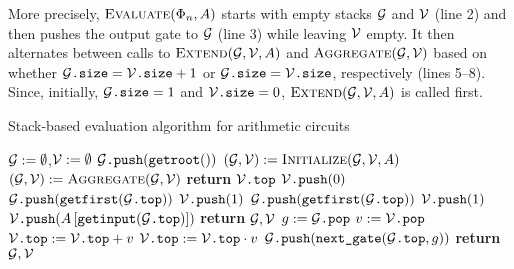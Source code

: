 More precisely, $\textsc{Evaluate}(\Phi_n,A)$ starts with empty stacks $\mathcal{G}$ and $\mathcal{V}$ (line 2) and then pushes the output
gate to $\mathcal{G}$ (line 3) while leaving $\mathcal{V}$ empty. It then alternates between calls to $\textsc{Extend}(\mathcal{G},\mathcal{V},A)$ and $\textsc{Aggregate}(\mathcal{G},\mathcal{V})$ based on whether $\mathcal{G}\texttt{.size} = \mathcal{V}\texttt{.size}+1$ or $\mathcal{G}\texttt{.size} = \mathcal{V}\texttt{.size}$, respectively (lines 5--8). Since, initially, $\mathcal{G}\texttt{.size}=1$ and $\mathcal{V}\texttt{.size}=0$, $\textsc{Extend}(\mathcal{G},\mathcal{V},A)$ is
called first.
 \begin{algorithm}[t]
  \caption{Stack-based evaluation algorithm for arithmetic circuits}
 \label{alg:eval_code}
 \begin{algorithmic}[1]
   \State $\mathcal{G}:=\emptyset$,$\mathcal{V}:=\emptyset$
    \State $\mathcal{G}\texttt{.push}(\texttt{getroot}())$ 
             \State $(\mathcal{G},\mathcal{V}) := \textsc{Initialize}(\mathcal{G},\mathcal{V},A)$
         \Else
             \State $(\mathcal{G},\mathcal{V}):= \textsc{Aggregate}(\mathcal{G},\mathcal{V})$
         \EndIf
     \EndWhile
     \State \textbf{return} $\mathcal{V}\texttt{.top}$
 \EndFunction
     \If{$\isplus{\gettop{\cG}}$} 
         \State $\mathcal{V}\texttt{.push}(0)$
         \State $\mathcal{G}\texttt{.push}(\texttt{getfirst}(\mathcal{G}\texttt{.top}))$ 
     \ElsIf{$\isprod{\gettop{\cG}}$} 
         \State $\mathcal{V}\texttt{.push}(1)$
         \State $\mathcal{G}\texttt{.push}(\texttt{getfirst}(\mathcal{G}\texttt{.top}))$
     \ElsIf{$\isone{\gettop{\cG}}$} 
         \State $\mathcal{V}\texttt{.push}(1)$
     \ElsIf{$\isinput{\gettop{\cG}}$} 
         \State $\mathcal{V}\texttt{.push}(A\left[ \texttt{getinput}(\mathcal{G}\texttt{.top}) \right])$ 
     \EndIf
     \State \textbf{return} $\mathcal{G}, \mathcal{V}$
 \EndFunction
     \State $g := \mathcal{G}\texttt{.pop}$
     \State $v := \mathcal{V}\texttt{.pop}$
     \If{$\isplus{\gettop{\cG}}$}
         \State $\mathcal{V}\texttt{.top} := \mathcal{V}\texttt{.top} + v$
     \ElsIf{$\isprod{\gettop{\cG}}$}
         \State $\mathcal{V}\texttt{.top} := \mathcal{V}\texttt{.top} \cdot v$
     \EndIf
      
         \State $\mathcal{G}\texttt{.push}(\texttt{next{\_}gate}(\mathcal{G}\texttt{.top}, g))$ 
     \EndIf
     \State \textbf{return} $\mathcal{G}, \mathcal{V}$
 \EndFunction
  \end{algorithmic}
 \end{algorithm}
